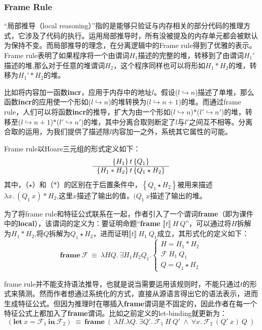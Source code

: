 \documentclass[a4paper,11pt]{article}
\begin{document}
\subsubsection{Frame Rule}
	“局部推导（local reasoning）”指的是能够只验证与内存相关的部分代码的推理方式，它涉及了代码的执行。运用局部推导时，所有没被提及的内存单元都会被默认为保持不变。而局部推导的理念，在分离逻辑中的Frame rule得到了优雅的表示。Frame rule表明了如果程序将一个由谓词$H_1$描述的完整的堆，转移到了由谓词$H_1'$描述的堆,那么对于任意的堆谓词$H_2$，这个程序同样也可以将形如$H_1*H_2$的堆，转移为$H_1'*H_2$的堆。

比如将内容加一函数\textbf{incr}，应用于内存中的地址$l$。假设($l \hookrightarrow n$)描述了单堆，那么函数\textbf{incr}的应用使一个形如($l \hookrightarrow n$)的堆转换为($l \hookrightarrow n+1$)的堆。而通过frame rule，人们可以将函数\textbf{incr}的推导，扩大为由一个形如($l \hookrightarrow n$)$*$($l' \hookrightarrow n'$)的堆，转移至($l \hookrightarrow n+1$)$*$($l' \hookrightarrow n'$)的堆，其中分离合取则断定了$l$与$l'$之间互不相等。分离合取的运用，为我们提供了描述除$l$内容加一之外，系统其它属性的可能。

Frame rule以Hoare三元组的形式定义如下：
	\begin{equation*}
	\begin{tabular}{c}
	$\left \{ H_1 \right \} t \left \{ Q_1 \right \}$
	\\
	\hline
	$\left \{ H_1*H_2 \right \} t \left \{ Q_1 \star H_2 \right \}$
	\end{tabular}
	\end{equation*}
其中，（$\star$）和（$*$）的区别在于后置条件中，$\left \{ Q_1 \star H_2 \right \}$被用来描述$\lambda x.~(Q_1~x)*H_2$,这里$x$描述了输出的值，$(Q_1~x$描述了输出的堆。

为了将frame rule和特征公式联系在一起，作者引入了一个谓词\textbf{frame}（即为课件中的\textbf{local}），该谓词的定义为：要证明命题“\textbf{frame} $\llbracket t \rrbracket~H~Q$”，可以通过将$H$拆解为$H_1*H_2$,将$Q$拆解为$Q_1 \star H_2$，进而证明$\llbracket t \rrbracket~H_1~Q_1$成立，其形式化的定义如下：
\begin{equation*}
\mathbf{frame}~\mathcal{F} ~\equiv~\lambda HQ.~\exists H_1 H_2 Q_1.\begin{cases}
H = H_1 * H_2
\\ \mathcal{F}~H_1~Q_1
\\ Q = Q_1 \star H_2
\end{cases} 
\end{equation*}

frame rule并不能支持语法推导，也就是说当需要运用该规则时，不能只通过$t$的形式来猜测。然而作者想通过系统化的方式，直接从源语言得出它的语法表示，进而生成特征公式。但因为推理时在哪插入\textbf{frame}谓词是不固定的，因此作者在每一个特征公式上都加入了\textbf{frame}谓词。比如之前定义的let-binding就更新为：
\begin{equation*}
( \mathbf{let} ~x=\mathcal{F}_1~\mathbf{in} ~\mathcal{F}_2 ) ~\equiv~\mathbf{frame}~(~\lambda H.\lambda Q.~\exists Q'.~\mathcal{F}_1~H~Q'~\wedge~\forall x. ~\mathcal{F}_2~(Q'~x )~Q~) 
\end{equation*}
\end{document}
